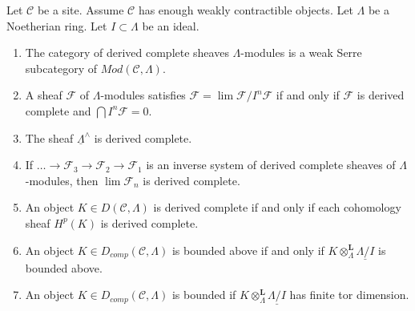\begin{proposition}
\label{proposition-enough-weakly-contractibles}
Let $\mathcal{C}$ be a site. Assume $\mathcal{C}$ has enough
weakly contractible objects.
Let $\Lambda$ be a Noetherian ring. Let $I \subset \Lambda$ be an ideal.
\begin{enumerate}
\item The category of derived complete sheaves $\Lambda$-modules is a
weak Serre subcategory of $\textit{Mod}(\mathcal{C}, \Lambda)$.
\item A sheaf $\mathcal{F}$ of $\Lambda$-modules satisfies
$\mathcal{F} = \lim \mathcal{F}/I^n\mathcal{F}$ if and only if
$\mathcal{F}$ is derived complete and $\bigcap I^n\mathcal{F} = 0$.
\item The sheaf $\underline{\Lambda}^\wedge$ is derived complete.
\item If $\ldots \to \mathcal{F}_3 \to \mathcal{F}_2 \to \mathcal{F}_1$
is an inverse system of derived complete sheaves of $\Lambda$-modules,
then $\lim \mathcal{F}_n$ is derived complete.
\item An object $K \in D(\mathcal{C}, \Lambda)$ is derived complete if
and only if each cohomology sheaf $H^p(K)$ is derived complete.
\item An object $K \in D_{comp}(\mathcal{C}, \Lambda)$ is bounded above
if and only if $K \otimes_\Lambda^\mathbf{L} \underline{\Lambda/I}$
is bounded above.
\item An object $K \in D_{comp}(\mathcal{C}, \Lambda)$ is bounded
if $K \otimes_\Lambda^\mathbf{L} \underline{\Lambda/I}$ has finite
tor dimension.
\end{enumerate}
\end{proposition}

